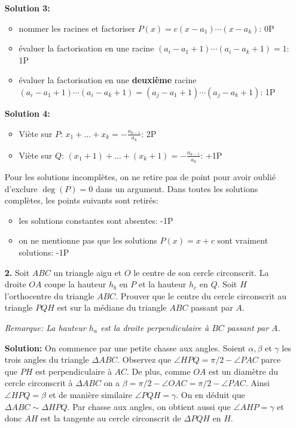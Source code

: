 \documentclass[language=german,style=solution]{smo}
\begin{document}
\begin{enumerate}
\textbf{Solution 3:}
\begin{itemize}
\item nommer les racines et factoriser $P(x)=c(x-a_1)\cdots(x-a_k)$: 0P
\item évaluer la factorisation en une racine $(a_i-a_1+1)\cdots (a_i-a_{k}+1)=1$: 1P
\item évaluer la factorisation en une \textbf{deuxième} racine $(a_i-a_1+1)\cdots (a_i-a_{k}+1)=(a_j-a_1+1)\cdots (a_j-a_{k}+1)$: 1P
\end{itemize}

\textbf{Solution 4:}
\begin{itemize}
\item Viète sur $P$: $x_1+\ldots+x_k=-\frac{a_{k-1}}{a_k}$: 2P
\item Viète sur $Q$: $(x_1+1) + \ldots + (x_k+1) = -\frac{a_{k-1}}{a_k}$: +1P
\end{itemize}

Pour les solutions incomplètes, on ne retire pas de point pour avoir oublié d'exclure $\deg(P)=0$ dans un argument. Dans toutes les solutions complètes, les points suivants sont retirés:
\begin{itemize}
\item les solutions constantes sont absentes: -1P
\item on ne mentionne pas que les solutions $P(x)=x+c$ sont vraiment solutions: -1P
\end{itemize}
\newpage

\item[\textbf{2.}] %
Soit $ABC$ un triangle aigu et $O$ le centre de son cercle circonscrit. La droite $OA$ coupe la hauteur $h_b$ en $P$ et la hauteur $h_c$ en $Q$. Soit $H$ l'orthocentre du triangle $ABC$. Prouver que le centre du cercle circonscrit au triangle $PQH$ est sur la médiane du triangle $ABC$ passant par $A$.

\textit{Remarque: La hauteur $h_a$ est la droite perpendiculaire à $BC$ passant par $A$.}


\textbf{Solution:}
On commence par une petite chasse aux angles. Soient $\alpha,\beta$ et $\gamma$ les trois angles du triangle $\Delta ABC$. Observez que $\angle HPQ=\pi/2-\angle PAC$ parce que $PH$ est perpendiculaire à $AC$. De plus, comme $OA$ est un diamètre du cercle circonscrit à $\Delta ABC$ on a $\beta=\pi/2-\angle OAC=\pi/2-\angle PAC$. Ainsi $\angle HPQ=\beta$ et de manière similaire $\angle PQH=\gamma$. On en déduit que $\Delta ABC\sim \Delta HPQ$. Par chasse aux angles, on obtient aussi que $\angle AHP =\gamma$ et donc $AH$ est la tangente au cercle circonscrit de $\Delta PQH$ en $H$.


\end{enumerate}
\end{document}
